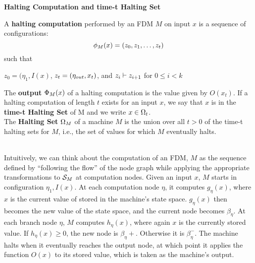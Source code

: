 \begin{definition}{\textbf{Halting Computation and time-t Halting Set}}

  A \textbf{halting computation} performed by an FDM $M$ on input $x$
  is a sequence of configurations: 
  $$\phi_M(x) = (z_0, z_1, \ldots, z_t)$$ such that
  
  \centerline{$z_0 = (\eta_1, I(x)$, $z_t = (\eta_{out}, x_t)$, and $z_i
    \vdash z_{i+1}$ for $0 \leq i < k$}
  
  \vspace{\baselineskip}
  
  The \textbf{output} $\Phi_M(x)$ of a halting computation is
  the value given by $O(x_t)$.  If a halting computation of length $t$
  exists for an input $x$, we say that $x$ is in the \textbf{time-t
    Halting Set} of M and we write $x \in \Omega_t$.  \\

  The \textbf{Halting Set} $\Omega_M$ of a machine $M$ is the union
  over all $t > 0$ of the time-t halting sets for $M$, i.e., the set of
  values for which $M$ eventually halts.
\end{definition}

\\

Intuitively, we can think about the computation of an FDM, $M$ as the
sequence defined by ``following the flow'' of the node graph while
applying the appropriate transformations to $\mathcal{S}_M$ at
computation nodes. Given an input $x$, $M$ starts in configuration
$\eta_1, I(x)$. At each computation node $\eta$, it computes
$g_\eta(x)$, where $x$ is the current value of stored in the machine's
state space.  $g_\eta(x)$ then becomes the new value of the state
space, and the current node becomes $\beta_{\eta}$.  At each branch
node $\eta$, $M$ computes $h_\eta(x)$, where again $x$ is the
currently stored value.  If $h_\eta(x) \geq 0$, the new node is
$\beta_\eta+$.  Otherwise it is $\beta_\eta^-$.  The machine halts
when it eventually reaches the output node, at which point it applies
the function $O(x)$ to its stored value, which is taken as the
machine's output.\\


